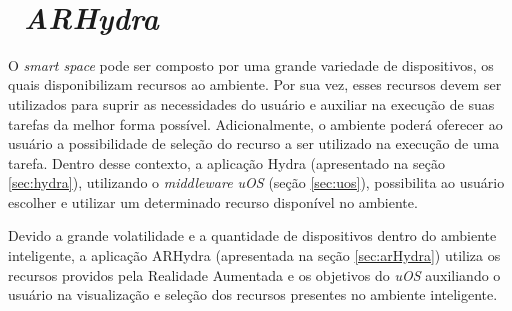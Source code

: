 ~\chapter{~\emph{ARHydra}}
\label{cap:arhydra}
	
		
	O \textit{smart space} pode ser composto por uma grande variedade de dispositivos, os quais
	disponibilizam recursos ao ambiente. Por sua vez, esses recursos devem ser utilizados para suprir
	as necessidades do usuário e auxiliar na execução de suas tarefas da melhor forma possível.
	Adicionalmente, o ambiente poderá oferecer ao usuário a possibilidade de seleção do recurso a ser
	utilizado na execução de uma tarefa. Dentro desse contexto, a aplicação Hydra (apresentado na
	seção \ref{sec:hydra}), utilizando o \textit{middleware uOS} (seção \ref{sec:uos}), possibilita ao
	usuário escolher e utilizar um determinado recurso disponível no ambiente.
	
	Devido a grande volatilidade e a quantidade de dispositivos dentro do ambiente inteligente, a
	aplicação ARHydra (apresentada na seção \ref{sec:arHydra}) utiliza os recursos providos pela
	Realidade Aumentada e os objetivos do \textit{uOS} auxiliando o usuário na visualização e seleção
	dos recursos presentes no ambiente inteligente.
	
	
	
	
